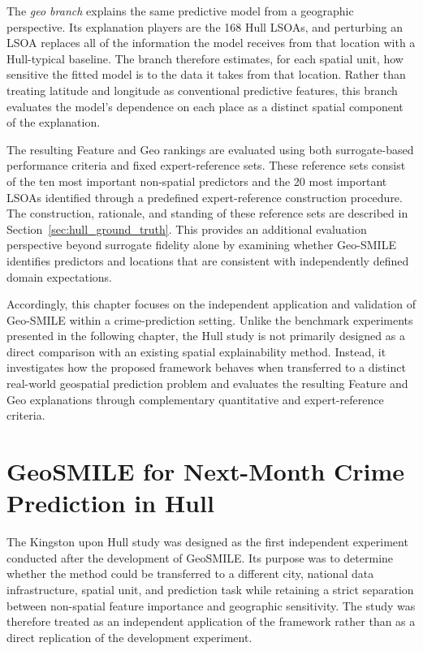 The \emph{geo branch} explains the same predictive model from a geographic perspective. Its explanation players are the 168 Hull LSOAs, and perturbing an LSOA replaces all of the information the model receives from that location with a Hull-typical baseline. The branch therefore estimates, for each spatial unit, how sensitive the fitted model is to the data it takes from that location. Rather than treating latitude and longitude as conventional predictive features, this branch evaluates the model's dependence on each place as a distinct spatial component of the explanation.

The resulting Feature and Geo rankings are evaluated using both surrogate-based performance criteria and fixed expert-reference sets. These reference sets consist of the ten most important non-spatial predictors and the 20 most important LSOAs identified through a predefined expert-reference construction procedure. The construction, rationale, and standing of these reference sets are described in Section~\ref{sec:hull_ground_truth}. This provides an additional evaluation perspective beyond surrogate fidelity alone by examining whether Geo-SMILE identifies predictors and locations that are consistent with independently defined domain expectations.

Accordingly, this chapter focuses on the independent application and validation of Geo-SMILE within a crime-prediction setting. Unlike the benchmark experiments presented in the following chapter, the Hull study is not primarily designed as a direct comparison with an existing spatial explainability method. Instead, it investigates how the proposed framework behaves when transferred to a distinct real-world geospatial prediction problem and evaluates the resulting Feature and Geo explanations through complementary quantitative and expert-reference criteria.

\section{GeoSMILE for Next-Month Crime Prediction in Hull}
\label{sec:hull_first_independent_experiment}

The Kingston upon Hull study was designed as the first independent experiment conducted after the development of GeoSMILE. Its purpose was to determine whether the method could be transferred to a different city, national data infrastructure, spatial unit, and prediction task while retaining a strict separation between non-spatial feature importance and geographic sensitivity. The study was therefore treated as an independent application of the framework rather than as a direct replication of the development experiment.

